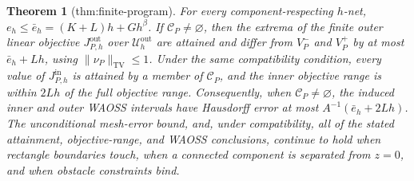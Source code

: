 \documentclass{article}
\newtheorem{theorem}{Theorem}
\begin{document}
\begin{theorem}[thm:finite-program]\label{thm:finite-program}
For every component-respecting \(h\)-net, \(e_h\leq\bar e_h=(K+L)h+Gh^\beta\). If \(\mathcal C_P\neq\varnothing\), then the extrema of the finite outer linear objective \(J_{P,h}^{\mathrm{out}}\) over \(\mathcal U_h^{\mathrm{out}}\) are attained and differ from \(V_P^-\) and \(V_P^+\) by at most \(\bar e_h+Lh\), using \(\|\nu_P\|_{\mathrm{TV}}\leq1\). Under the same compatibility condition, every value of \(J_{P,h}^{\mathrm{in}}\) is attained by a member of \(\mathcal C_P\), and the inner objective range is within \(2Lh\) of the full objective range. Consequently, when \(\mathcal C_P\neq\varnothing\), the induced inner and outer WAOSS intervals have Hausdorff error at most \(A^{-1}(\bar e_h+2Lh)\). The unconditional mesh-error bound, and, under compatibility, all of the stated attainment, objective-range, and WAOSS conclusions, continue to hold when rectangle boundaries touch, when a connected component is separated from \(z=0\), and when obstacle constraints bind.
\end{theorem}
\end{document}
